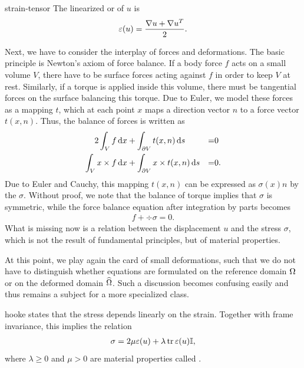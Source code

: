 \begin{Definition}{strain-tensor}
  The linearized  or 
  of $u$ is
  \begin{gather}
    \varepsilon(u) = \frac{\nabla u + \nabla u^T}2.
  \end{gather}
\end{Definition}

\begin{intro}
  Next, we have to consider the interplay of forces and
  deformations. The basic principle is Newton's axiom of force
  balance. If a body force $f$ acts on a small volume $V$, there have
  to be surface forces acting against $f$ in order to keep $V$ at
  rest. Similarly, if a torque is applied inside this volume, there
  must be tangential forces on the surface balancing this torque. Due
  to Euler, we model these forces as a mapping $t$, which at each
  point $x$ maps a direction vector $n$ to a force vector
  $t(x,n)$. Thus, the balance of forces is written as
  \begin{alignat*}2
    \int_V f \dx &+ \int_{\d V} t(x,n) \ds &=&0\\
    \int_V x\times f \dx &+ \int_{\d V} x\times t(x,n) \ds &=&0.
  \end{alignat*}
  Due to Euler and Cauchy, this mapping $t(x,n)$ can be expressed as
  $\sigma(x)n$ by the  $\sigma$. Without proof,
  we note that the balance of torque implies that $\sigma$ is
  symmetric, while the force balance equation after integration by
  parts becomes
  \begin{gather}
    \label{eq:mixedintro:3}
    f + \div \sigma = 0.
  \end{gather}
  What is missing now is a relation between the displacement $u$ and
  the stress $\sigma$, which is not the result of fundamental
  principles, but of material properties.
\end{intro}

\begin{remark}
  At this point, we play again the card of small deformations, such
  that we do not have to distinguish whether equations are formulated
  on the reference domain $\Omega$ or on the deformed domain
  $\widehat{\Omega}$. Such a discussion becomes confusing easily and
  thus remains a subject for a more specialized class.
\end{remark}

\begin{Definition}{hooke}
   states that the stress depends linearly on the
  strain. Together with frame invariance, this implies the relation
  \begin{gather}
    \label{eq:mixedintro:4}
    \sigma = 2\mu \varepsilon(u) + \lambda \operatorname{tr} \varepsilon(u) \mathbb I,
  \end{gather}
  where $\lambda\ge 0$ and $\mu> 0$ are material properties called
  .
\end{Definition}

